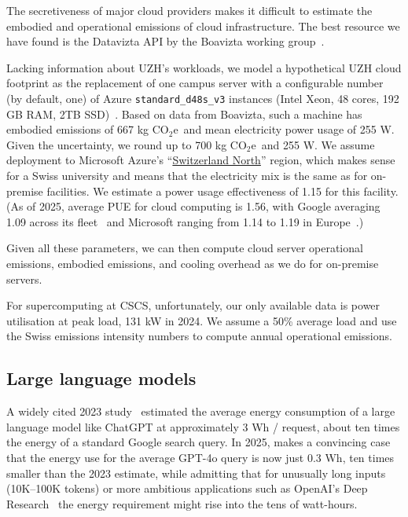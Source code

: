 \documentclass[11pt]{article}
\newcommand{\coe}{CO$_2$e}
\newcommand{\gcoe}{g \coe}
\newcommand{\kgcoe}{k\gcoe}
\begin{document}
The secretiveness of major cloud providers makes it difficult to estimate the embodied and operational emissions of cloud infrastructure. The best resource we have found is the Datavizta API by the Boavizta working group~\cite{boavizta:api}.

Lacking information about UZH's workloads, we model a hypothetical UZH cloud footprint as the replacement of one campus server with a configurable number (by default, one) of Azure {\tt standard\_d48s\_v3} instances (Intel Xeon, 48 cores, 192 GB RAM, 2TB SSD)~\cite{msftvms}. Based on data from Boavizta, such a machine has embodied emissions of 667 \kgcoe\ and mean electricity power usage of 255 W. Given the uncertainty, we round up to 700 \kgcoe\ and 255 W. We assume deployment to Microsoft Azure's ``\href{https://datacenters.microsoft.com/globe/explore?info=region_switzerlandnorth}{Switzerland North}'' region, which makes sense for a Swiss university and means that the electricity mix is the same as for on-premise facilities. We estimate a power usage effectiveness of 1.15 for this facility. (As of 2025, average PUE for cloud computing is 1.56, with Google averaging 1.09 across its fleet~\cite{google:datacenter:efficiency} and Microsoft ranging from 1.14 to 1.19 in Europe~\cite{microsoft:datacenter:efficiency}.)

Given all these parameters, we can then compute cloud server operational emissions, embodied emissions, and cooling overhead as we do for on-premise servers.

For supercomputing at CSCS, unfortunately, our only available data is power utilisation at peak load, 131 kW in 2024. We assume a 50\% average load and use the Swiss emissions intensity numbers to compute annual operational emissions.

\subsection{Large language models}

A widely cited 2023 study~\cite{devries2023growing} estimated the average energy consumption of a large language model like ChatGPT at approximately 3 Wh / request, about ten times the energy of a standard Google search query. In 2025, \textcite{epoch2025howmuchenergydoeschatgptuse} makes a convincing case that the energy use for the average GPT-4o query is now just 0.3 Wh, ten times smaller than the 2023 estimate, while admitting that for unusually long inputs (10K--100K tokens) or more ambitious applications such as OpenAI's Deep Research~\cite{oai:deepresearch} the energy requirement might rise into the tens of watt-hours.
\end{document}
